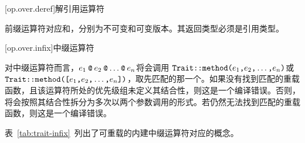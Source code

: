 [op.over.deref]{解引用运算符}

\pnum
前缀\tcode{*}运算符对应和，分别为不可变和可变版本。其返回类型必须是引用类型。

[op.over.infix]{中缀运算符}

\pnum
对中缀运算符而言，$e_1\mathbin{\texttt{@}}e_2\mathbin{\texttt{@}}\ldots\mathbin{\texttt{@}}e_n$将会调用
$\texttt{Trait::method(}e_1\texttt{,}e_2\texttt{,}\ldots\texttt{,}e_n\texttt{)}$或\\$\texttt{Trait::method([}e_1\texttt{,}e_2\texttt{,}\ldots\texttt{,}e_n\texttt{])}$，取先匹配的那一个。如果没有找到匹配的重载函数，且该运算符所处的优先级组未定义其结合性，则这是一个编译错误。否则，将会按照其结合性拆分为多次以两个参数调用的形式。若仍然无法找到匹配的重载函数，则这是一个编译错误。

\pnum
表~\ref{tab:trait-infix}~列出了可重载的内建中缀运算符对应的概念。

